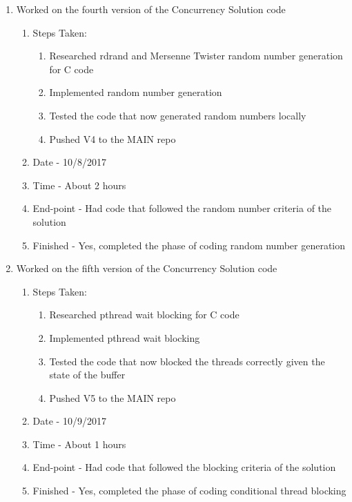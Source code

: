 \documentclass[letterpaper,10pt,fleqn]{article}
\begin{document}
\begin{enumerate}
\begin{enumerate}
	\item Worked on the fourth version of the Concurrency Solution code
		\begin{enumerate}
			\item Steps Taken:
				\begin{enumerate}
					\item Researched rdrand and Mersenne Twister random number generation for C code
					\item Implemented random number generation
					\item Tested the code that now generated random numbers locally
					\item Pushed V4 to the MAIN repo
				\end{enumerate}
			\item Date - 10/8/2017
			\item Time - About 2 hours
			\item End-point - Had code that followed the random number criteria of the solution
			\item Finished - Yes, completed the phase of coding random number generation
		\end {enumerate}
		
	\item Worked on the fifth version of the Concurrency Solution code
		\begin{enumerate}
			\item Steps Taken:
				\begin{enumerate}
					\item Researched pthread wait blocking for C code
					\item Implemented pthread wait blocking
					\item Tested the code that now blocked the threads correctly given the state of the buffer
					\item Pushed V5 to the MAIN repo
				\end{enumerate}
			\item Date - 10/9/2017
			\item Time - About 1 hours
			\item End-point - Had code that followed the blocking criteria of the solution
			\item Finished - Yes, completed the phase of coding conditional thread blocking
		\end {enumerate}
\end {enumerate}
\end {enumerate}
		
\end{document}
